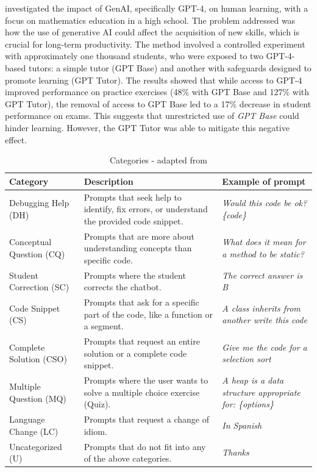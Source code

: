\documentclass[a4paper,twoside]{article}
\begin{document}
\cite{Bastani24} investigated the impact of GenAI, specifically GPT-4, on human
learning, with a focus on mathematics education in a high school. The problem
addressed was how the use of generative AI could affect the acquisition of new
skills, which is crucial for long-term productivity. The method involved a
controlled experiment with approximately one thousand students, who were exposed
to two GPT-4-based tutors: a simple tutor (GPT Base) and another with safeguards
designed to promote learning (GPT Tutor). The results showed that while access
to GPT-4 improved performance on practice exercises (48\% with GPT Base and
127\% with GPT Tutor), the removal of access to GPT Base led to a 17\% decrease
in student performance on exams. This suggests that unrestricted use of
\textit{GPT Base} could hinder learning. However, the GPT Tutor was able to
mitigate this negative effect.
\begin{table}[htbp]
  \caption{Categories - adapted from \cite{Ghimire24}}
  \begin{center}
    \renewcommand{\arraystretch}{1.2} %
    \begin{tabular}{p{3.8cm} p{6cm} p{4.5cm}} %
      \hline
      \textbf{Category} & \textbf{Description} & \textbf{Example of prompt} \\
      \hline
      Debugging Help (DH) & Prompts that seek help to identify, fix errors, or understand the provided code snippet. & \textit{Would this code be ok? \{code\}} \\
      Conceptual Question (CQ) & Prompts that are more about understanding concepts than specific code. & \textit{What does it mean for a method to be static?} \\
      Student Correction (SC) & Prompts where the student corrects the chatbot. & \textit{The correct answer is B} \\
      Code Snippet  (CS) & Prompts that ask for a specific part of the code, like a function or a segment. & \textit{A class inherits from another write this code} \\
      Complete Solution (CSO) & Prompts that request an entire solution or a complete code snippet. & \textit{Give me the code for a selection sort} \\
      Multiple Question (MQ) & Prompts where the user wants to solve a multiple choice exercise (Quiz). & \textit{A heap is a data structure appropriate for: \{options\}} \\
      Language Change (LC) & Prompts that request a change of idiom. & \textit{In Spanish} \\
      Uncategorized (U) & Prompts that do not fit into any of the above categories. & \textit{Thanks} \\
      \hline
    \end{tabular}
    \label{tab:categories}
  \end{center}
\end{table}
\end{document}
